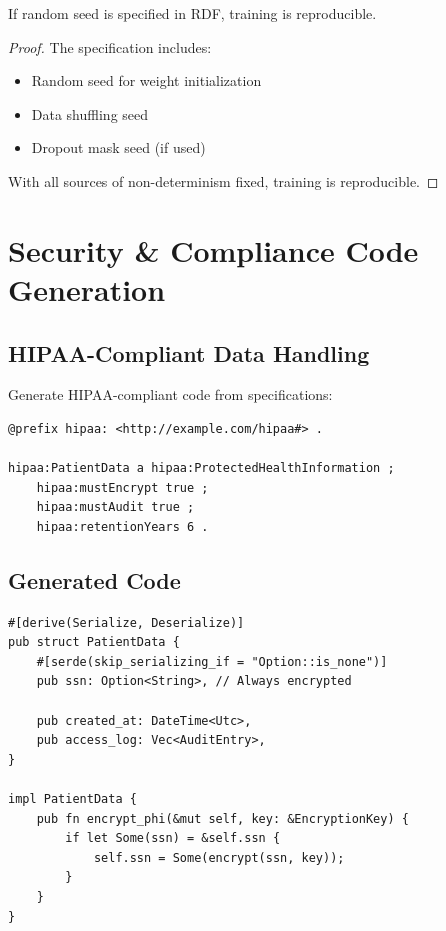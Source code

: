\begin{theorem}
    If random seed is specified in RDF, training is reproducible.
\end{theorem}

\begin{proof}
    The specification includes:
    \begin{itemize}
        \item Random seed for weight initialization
        \item Data shuffling seed
        \item Dropout mask seed (if used)
    \end{itemize}
    With all sources of non-determinism fixed, training is reproducible.
\end{proof}

\section{Security \& Compliance Code Generation}

\subsection{HIPAA-Compliant Data Handling}

Generate HIPAA-compliant code from specifications:

\begin{verbatim}
@prefix hipaa: <http://example.com/hipaa#> .

hipaa:PatientData a hipaa:ProtectedHealthInformation ;
    hipaa:mustEncrypt true ;
    hipaa:mustAudit true ;
    hipaa:retentionYears 6 .
\end{verbatim}

\subsection{Generated Code}

\begin{verbatim}
#[derive(Serialize, Deserialize)]
pub struct PatientData {
    #[serde(skip_serializing_if = "Option::is_none")]
    pub ssn: Option<String>, // Always encrypted

    pub created_at: DateTime<Utc>,
    pub access_log: Vec<AuditEntry>,
}

impl PatientData {
    pub fn encrypt_phi(&mut self, key: &EncryptionKey) {
        if let Some(ssn) = &self.ssn {
            self.ssn = Some(encrypt(ssn, key));
        }
    }
}
\end{verbatim}

